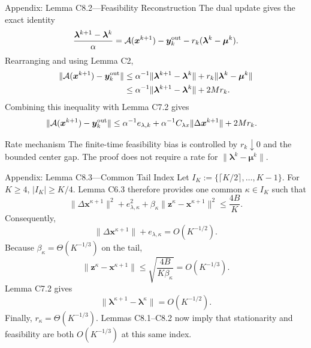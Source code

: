 \documentclass[handout,compress,9pt]{beamer}
\newcommand{\bx}{\bm{x}}
\newcommand{\by}{\bm{y}}
\newcommand{\bz}{\bm{z}}
\newcommand{\bmu}{\bm{\mu}}
\newcommand{\blmbd}{\bm{\lambda}}
\newcommand{\calA}{\mathcal{A}}
\begin{document}
\begin{frame}{Appendix: Lemma C8.2---Feasibility Reconstruction
\hfill\hyperlink{appendix:contents}{}}
\scriptsize
The dual update gives the exact identity
\begin{equation*}
  \frac{\blmbd^{k+1}-\blmbd^k}{\alpha}
  =\calA(\bx^{k+1})-\by_k^{\rm out}
  -r_k(\blmbd^k-\bmu^k).
\end{equation*}
Rearranging and using Lemma C2,
\begin{equation*}
\begin{aligned}
  \|\calA(\bx^{k+1})-\by_k^{\rm out}\|
  &\le\alpha^{-1}\|\blmbd^{k+1}-\blmbd^k\|
  +r_k\|\blmbd^k-\bmu^k\|\\
  &\le\alpha^{-1}\|\blmbd^{k+1}-\blmbd^k\|+2Mr_k.
\end{aligned}
\end{equation*}
Combining this inequality with Lemma C7.2 gives
\begin{equation*}
\begin{aligned}
  \|\calA(\bx^{k+1})-\by_k^{\rm out}\|
  \le{}&\alpha^{-1}e_{\lambda,k}
  +\alpha^{-1}C_{\lambda x}\|\Delta\bx^{k+1}\|+2Mr_k.
\end{aligned}
\end{equation*}
\begin{block}{Rate mechanism}
The finite-time feasibility bias is controlled by $r_k\downarrow0$ and the
bounded center gap.  The proof does not require a rate for
$\|\blmbd^k-\bmu^k\|$.
\end{block}
\end{frame}

\begin{frame}{Appendix: Lemma C8.3---Common Tail Index
\hfill\hyperlink{appendix:contents}{}}
\scriptsize
Let $I_K:=\{\lceil K/2\rceil,\ldots,K-1\}$.  For $K\ge4$,
$|I_K|\ge K/4$.  Lemma C6.3 therefore provides one common
$\kappa\in I_K$ such that
\begin{equation*}
  \|\Delta\bx^{\kappa+1}\|^2+e_{\lambda,\kappa}^2
  +\beta_\kappa\|\bz^\kappa-\bx^{\kappa+1}\|^2
  \le\frac{4B}{K}.
\end{equation*}
Consequently,
\begin{equation*}
  \|\Delta\bx^{\kappa+1}\|+e_{\lambda,\kappa}=O(K^{-1/2}).
\end{equation*}
Because $\beta_\kappa=\Theta(K^{-1/3})$ on the tail,
\begin{equation*}
  \|\bz^\kappa-\bx^{\kappa+1}\|
  \le\sqrt{\frac{4B}{K\beta_\kappa}}=O(K^{-1/3}).
\end{equation*}
Lemma C7.2 gives
\begin{equation*}
  \|\blmbd^{\kappa+1}-\blmbd^\kappa\|=O(K^{-1/2}).
\end{equation*}
Finally, $r_\kappa=\Theta(K^{-1/3})$.  Lemmas C8.1--C8.2 now imply that
stationarity and feasibility are both $O(K^{-1/3})$ at this same index.
\end{frame}
\end{document}
